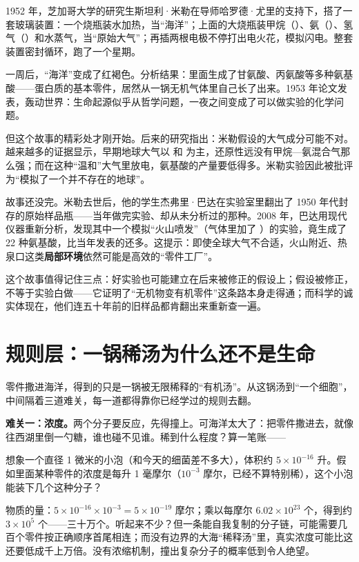 \begin{zhengju}
1952 年，芝加哥大学的研究生斯坦利·米勒在导师哈罗德·尤里的支持下，搭了一套玻璃装置：一个烧瓶装水加热，当“海洋”；上面的大烧瓶装甲烷（）、氨（）、氢气（）和水蒸气，当“原始大气”；再插两根电极不停打出电火花，模拟闪电。整套装置密封循环，跑了一个星期。

一周后，“海洋”变成了红褐色。分析结果：里面生成了甘氨酸、丙氨酸等多种氨基酸——蛋白质的基本零件，居然从一锅无机气体里自己长了出来。1953 年论文发表，轰动世界：生命起源似乎从哲学问题，一夜之间变成了可以做实验的化学问题。

但这个故事的精彩处才刚开始。后来的研究指出：米勒假设的大气成分可能不对。越来越多的证据显示，早期地球大气以  和  为主，还原性远没有甲烷—氨混合气那么强；而在这种“温和”大气里放电，氨基酸的产量要低得多。米勒实验因此被批评为“模拟了一个并不存在的地球”。

故事还没完。米勒去世后，他的学生杰弗里·巴达在实验室里翻出了 1950 年代封存的原始样品瓶——当年做完实验、却从未分析过的那种。2008 年，巴达用现代仪器重新分析，发现其中一个模拟“火山喷发”（气体里加了 ）的实验，竟生成了 22 种氨基酸，比当年发表的还多。这提示：即使全球大气不合适，火山附近、热泉口这类\textbf{局部环境}依然可能是高效的“零件工厂”。

这个故事值得记住三点：好实验也可能建立在后来被修正的假设上；假设被修正，不等于实验白做——它证明了“无机物变有机零件”这条路本身走得通；而科学的诚实体现在，他们连五十年前的旧样品都肯翻出来重新查一遍。
\end{zhengju}

\section{规则层：一锅稀汤为什么还不是生命}

零件撒进海洋，得到的只是一锅被无限稀释的“有机汤”。从这锅汤到“一个细胞”，中间隔着三道难关，每一道都得靠你已经学过的规则去翻。

\textbf{难关一：浓度。}两个分子要反应，先得撞上。可海洋太大了：把零件撒进去，就像往西湖里倒一勺糖，谁也碰不见谁。稀到什么程度？算一笔账——

\begin{qiaoliang}
想象一个直径 1 微米的小泡（和今天的细菌差不多大），体积约 $5\times 10^{-16}$ 升。假如里面某种零件的浓度是每升 1 毫摩尔（$10^{-3}$ 摩尔，已经不算特别稀），这个小泡能装下几个这种分子？

物质的量：$5\times 10^{-16}\times 10^{-3}=5\times 10^{-19}$ 摩尔；乘以每摩尔 $6.02\times 10^{23}$ 个，得到约 $3\times 10^{5}$ 个——三十万个。听起来不少？但一条能自我复制的分子链，可能需要几百个零件按正确顺序首尾相连；而没有边界的大海“稀释汤”里，真实浓度可能比这还要低成千上万倍。没有浓缩机制，撞出复杂分子的概率低到令人绝望。
\end{qiaoliang}

